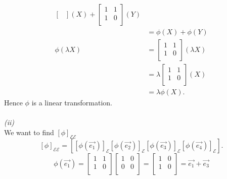 \documentclass{report}
\begin{document}
{\begin{align*}
\begin{bmatrix}
          \end{bmatrix} \left(  X \right) + \begin{bmatrix}
          1 & 1\\
          1 & 0\\
          \end{bmatrix} \left(  Y \right)\\
          &= \phi \left(  X \right) + \phi \left(  Y \right)\\
          \phi \left(  \lambda X \right) &= \begin{bmatrix}
          1 & 1\\
          1 & 0\\
          \end{bmatrix} \left( \lambda X \right) \\
          &= \lambda \begin{bmatrix}
          1 & 1\\
          1 & 0\\
          \end{bmatrix} \left(  X \right)\\
          &= \lambda \phi \left(  X \right)
        .\end{align*}
        Hence $ \phi$ is a linear transformation.\\
        \\
        \textit{(ii)}\\
        We want to find $ \left[ \phi  \right]_{ \mathcal{E} \mathcal{E}}$
        \[
          \left[ \phi  \right]_{ \mathcal{E} \mathcal{E}} = \left[ \left[ \phi \left( \vec{ e_1}  \right)  \right]_{ \mathcal{E}} \left[ \phi \left( \vec{ e_2}  \right)  \right] _{ \mathcal{E}} \left[ \phi \left( \vec{ e_3}  \right)  \right] _{ \mathcal{E}} \left[ \phi \left( \vec{ e_4}  \right)  \right] _{ \mathcal{E}}  \right]
        .\] 
        \[
        \phi \left( \vec{ e_1}  \right) = \begin{bmatrix}
        1 & 1\\
        1 & 0\\
        \end{bmatrix} \begin{bmatrix}
        1 & 0\\
        0 & 0\\
        \end{bmatrix} = \begin{bmatrix}
        1 & 0\\
        1 & 0\\
        \end{bmatrix} = \vec{ e_1} + \vec{ e_3} 
\]}
\end{document}
